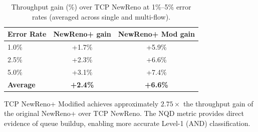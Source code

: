 \documentclass[12pt,a4paper]{article}
\begin{document}
\begin{table}[H]
\centering
\caption{All three TCP variants on the wired–wireless mixed topology
         (segments delivered / throughput in Mbps).}
\label{tab:3way}
\renewcommand{\arraystretch}{1.3}
\end{table}

\begin{table}[H]
\centering
\caption{Throughput gain (\%) over TCP NewReno at 1\%–5\% error rates
         (averaged across single and multi-flow).}
\label{tab:gain}
\renewcommand{\arraystretch}{1.3}
\begin{tabular}{@{}lcc@{}}
\toprule
\textbf{Error Rate} &
\textbf{NewReno+ gain} &
\textbf{NewReno+ Mod gain} \\
\midrule
1.0\%  & +1.7\% & +5.9\% \\
2.5\%  & +2.3\% & +6.6\% \\
5.0\%  & +3.1\% & +7.4\% \\
\midrule
\textbf{Average} & \textbf{+2.4\%} & \textbf{+6.6\%} \\
\bottomrule
\end{tabular}
\end{table}

TCP NewReno+ Modified achieves approximately $\mathbf{2.75\times}$ the
throughput gain of the original NewReno+ over TCP NewReno. The NQD metric
provides direct evidence of queue buildup, enabling more accurate Level-1
(AND) classification.
\end{document}
